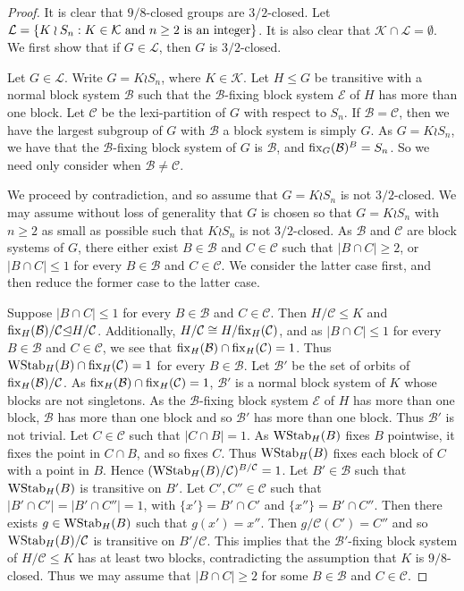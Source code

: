 \documentclass{amsart}
\theoremstyle{definition}
\theoremstyle{remark}
\numberwithin{equation}{section}
\def\tl{{\unlhd}}
\def\fix{{\rm fix}}
\def\cal{\mathcal}
\def\WStab{{\rm WStab}}
\begin{document}
\begin{proof}
It is clear that $9/8$-closed groups are $3/2$-closed.  Let ${\cal L} = \{K\wr S_n:K\in{\cal K}{\rm \ and\ }n\ge 2{\rm \ is\ an\ integer}\}$.  It is also clear that ${\cal K}\cap{\cal L} = \emptyset$.  We first show that if $G\in{\cal L}$, then $G$ is $3/2$-closed.

Let $G\in {\cal L}$.  Write $G = K\wr S_n$, where $K\in{\cal K}$.  Let $H\le G$ be transitive with a normal block system ${\cal B}$ such that the ${\cal B}$-fixing block system ${\cal E}$ of $H$ has more than one block.  Let ${\cal C}$ be the lexi-partition of $G$ with respect to $S_n$.  If ${\cal B} = {\cal C}$, then we have the largest subgroup of $G$ with ${\cal B}$ a block system is simply $G$.  As $G = K\wr S_n$, we have that the ${\cal B}$-fixing block system of $G$ is ${\cal B}$, and $\fix_G({\cal B})^B = S_n$.  So we need only consider when ${\cal B}\not = {\cal C}$.

We proceed by contradiction, and so assume that $G = K\wr S_n$ is not $3/2$-closed.   We may assume without loss of generality that $G$ is chosen so that $G = K\wr S_n$ with $n\ge 2$ as small as possible such that $K\wr S_n$ is not $3/2$-closed.  As ${\cal B}$ and ${\cal C}$ are block systems of $G$, there either exist $B\in{\cal B}$ and $C\in{\cal C}$ such that $\vert B\cap C\vert\ge 2$, or $\vert B\cap C\vert\le 1$ for every $B\in{\cal B}$ and $C\in{\cal C}$.  We consider the latter case first, and then reduce the former case to the latter case.

Suppose $\vert B\cap C\vert \le 1$ for every $B\in{\cal B}$ and $C\in{\cal C}$.  Then $H/{\cal C}\le K$ and $\fix_H({\cal B})/{\cal C}\tl H/{\cal C}$.  Additionally, $H/{\cal C}\cong H/\fix_H({\cal C})$, and as $\vert B\cap C\vert\le 1$ for every $B\in{\cal B}$ and $C\in{\cal C}$, we see that $\fix_H({\cal B})\cap\fix_H({\cal C}) = 1$.  Thus $\WStab_H(B)\cap\fix_H({\cal C}) = 1$ for every $B\in{\cal B}$.  Let ${\cal B}'$ be the set of orbits of $\fix_H({\cal B})/{\cal C}$.  As $\fix_H({\cal B})\cap\fix_H({\cal C}) = 1$, ${\cal B}'$ is a normal block system of $K$ whose blocks are not singletons.  As the ${\cal B}$-fixing block system ${\cal E}$ of $H$ has more than one block, ${\cal B}$ has more than one block and so ${\cal B}'$ has more than one block.  Thus ${\cal B}'$ is not trivial.  Let $C\in{\cal C}$ such that $\vert C\cap B\vert = 1$.  As $\WStab_H(B)$ fixes $B$ pointwise, it fixes the point in $C\cap B$, and so fixes $C$.  Thus $\WStab_H(B)$ fixes each block of $C$ with a point in $B$.  Hence $(\WStab_H(B)/{\cal C})^{B/{\cal C}} = 1$.  Let $B'\in{\cal B}$ such that  $\WStab_H(B)$ is transitive on $B'$.  Let $C',C''\in {\cal C}$ such that $\vert B'\cap C'\vert = \vert B'\cap C''\vert = 1$, with $\{x'\} = B'\cap C'$ and $\{x''\} = B'\cap C''$.  Then there exists $g\in \WStab_H(B)$ such that $g(x') = x''$.  Then $g/{\cal C}(C') = C''$ and so $\WStab_H(B)/{\cal C}$ is transitive on $B'/{\cal C}$.  This implies that the ${\cal B}'$-fixing block system of $H/{\cal C}\le K$ has at least two blocks, contradicting the assumption that $K$ is $9/8$-closed.  Thus we may assume that $\vert B\cap C\vert\ge 2$ for some $B\in{\cal B}$ and $C\in{\cal C}$.


\end{proof}
\end{document}
